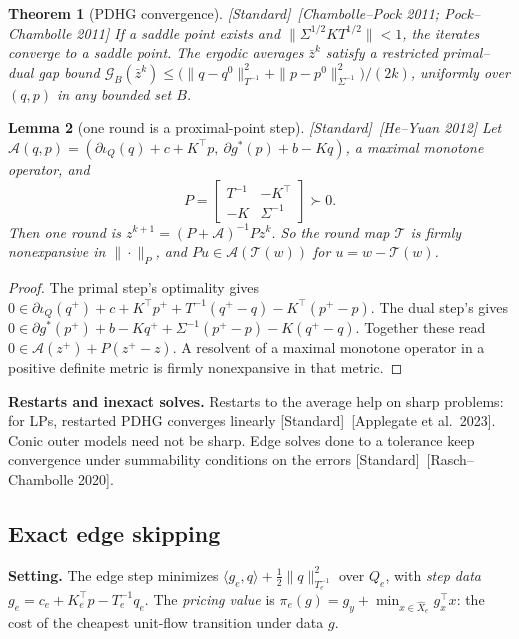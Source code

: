 \documentclass[11pt]{article}
\newcommand{\std}{\textcolor{muted}{[Standard]}\ }
\theoremstyle{plain}
\newtheorem{theorem}{Theorem}[section]
\newtheorem{lemma}[theorem]{Lemma}
\theoremstyle{definition}
\theoremstyle{remark}
\begin{document}
\begin{theorem}[PDHG convergence]\label{thm:pdhg}
\std[Chambolle--Pock 2011; Pock--Chambolle 2011] If a saddle point exists and $\|\Sigma^{1/2}KT^{1/2}\|<1$, the iterates converge to a saddle point. The ergodic averages $\bar z^k$ satisfy a restricted primal--dual gap bound $\mathcal G_B(\bar z^k)\le\big(\|q-q^0\|^2_{T^{-1}}+\|p-p^0\|^2_{\Sigma^{-1}}\big)/(2k)$, uniformly over $(q,p)$ in any bounded set $B$.
\end{theorem}

\begin{lemma}[one round is a proximal-point step]\label{lem:ppa}
\std[He--Yuan 2012] Let $\mathcal A(q,p)=(\partial\iota_Q(q)+c+K^\top p,\ \partial g^*(p)+b-Kq)$, a maximal monotone operator, and
\[
P=\begin{bmatrix}T^{-1}&-K^\top\\-K&\Sigma^{-1}\end{bmatrix}\succ0 .
\]
Then one round is $z^{k+1}=(P+\mathcal A)^{-1}Pz^k$. So the round map $\mathcal T$ is firmly nonexpansive in $\|\cdot\|_P$, and $Pu\in\mathcal A(\mathcal T(w))$ for $u=w-\mathcal T(w)$.
\end{lemma}
\begin{proof}
The primal step's optimality gives $0\in\partial\iota_Q(q^+)+c+K^\top p^+ +T^{-1}(q^+-q)-K^\top(p^+-p)$. The dual step's gives $0\in\partial g^*(p^+)+b-Kq^+ +\Sigma^{-1}(p^+-p)-K(q^+-q)$. Together these read $0\in\mathcal A(z^+)+P(z^+-z)$. A resolvent of a maximal monotone operator in a positive definite metric is firmly nonexpansive in that metric.
\end{proof}

\textbf{Restarts and inexact solves.} Restarts to the average help on sharp problems: for LPs, restarted PDHG converges linearly \std[Applegate et al.\ 2023]. Conic outer models need not be sharp. Edge solves done to a tolerance keep convergence under summability conditions on the errors \std[Rasch--Chambolle 2020].

\subsection{Exact edge skipping}
\textbf{Setting.} The edge step minimizes $\langle g_e,q\rangle+\tfrac12\|q\|^2_{T_e^{-1}}$ over $Q_e$, with \emph{step data} $g_e=c_e+K_e^\top p-T_e^{-1}q_e$. The \emph{pricing value} is $\pi_e(g)=g_y+\min_{x\in\hat X_e}g_x^\top x$: the cost of the cheapest unit-flow transition under data $g$.
\end{document}
